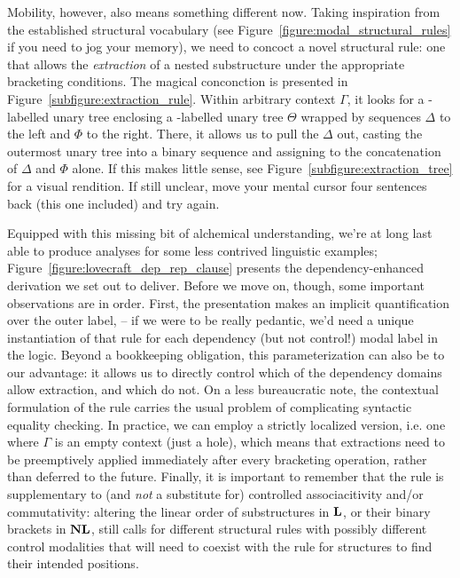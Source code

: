 Mobility, however, also means something different now.
Taking inspiration from the established structural vocabulary (see Figure~\ref{figure:modal_structural_rules} if you need to jog your memory), we need to concoct a novel structural rule: one that allows the \textit{extraction} of a nested substructure under the appropriate bracketing conditions.
The magical conconction is presented in Figure~\ref{subfigure:extraction_rule}.
Within arbitrary context $\Gamma$, it looks for a -labelled unary tree enclosing a -labelled unary tree $\Theta$ wrapped by sequences $\Delta$ to the left and $\Phi$ to the right.
There, it allows us to pull the $\Delta$ out, casting the outermost unary tree into a binary sequence and assigning  to the concatenation of $\Delta$ and $\Phi$ alone. 
If this makes little sense, see Figure~\ref{subfigure:extraction_tree} for a visual rendition.
If still unclear, move your mental cursor four sentences back (this one included) and try again.

Equipped with this missing bit of alchemical understanding, we're at long last able to produce analyses for some less contrived linguistic examples; Figure~\ref{figure:lovecraft_dep_rep_clause} presents the dependency-enhanced derivation we set out to deliver.
Before we move on, though, some important observations are in order.
First, the presentation makes an implicit quantification over the outer label,  -- if we were to be really pedantic, we'd need a unique instantiation of that rule for each dependency (but not control!) modal label in the logic.
Beyond a bookkeeping obligation, this parameterization can also be to our advantage: it allows us to directly control which of the dependency domains allow extraction, and which do not.
On a less bureaucratic note, the contextual formulation of the rule carries the usual problem of complicating syntactic equality checking. 
In practice, we can employ a strictly localized version, i.e. one where $\Gamma$ is an empty context (just a hole), which means that extractions need to be preemptively applied immediately after every bracketing operation, rather than deferred to the future.
Finally, it is important to remember that the rule is supplementary to (and \textit{not} a substitute for) controlled associacitivity and/or commutativity: altering the linear order of substructures in $\textbf{L}$, or their binary brackets in $\textbf{NL}$, still calls for different structural rules with possibly different control modalities that will need to coexist with the \Extraction{} rule for structures to find their intended positions.


